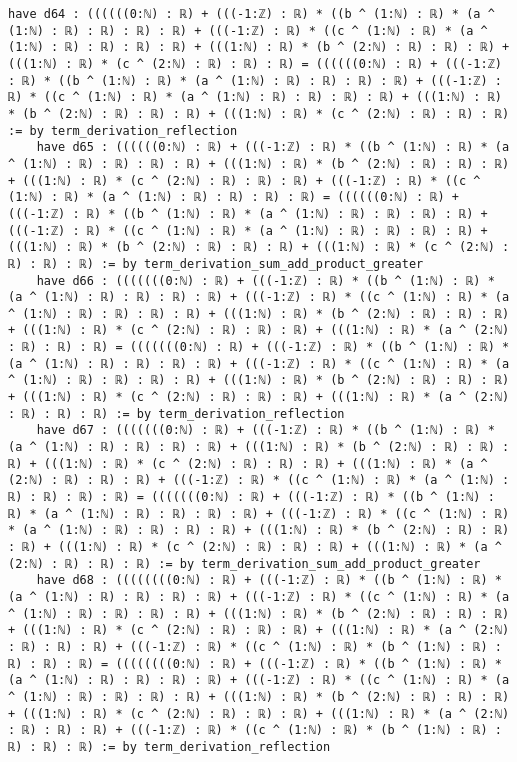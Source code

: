 \documentclass{article}
\begin{document}
\begin{tcolorbox}[colback=white!10, width=\linewidth]
\begin{lstlisting}[language=Lean4]
    have d64 : ((((((0:ℕ) : ℝ) + (((-1:ℤ) : ℝ) * ((b ^ (1:ℕ) : ℝ) * (a ^ (1:ℕ) : ℝ) : ℝ) : ℝ) : ℝ) + (((-1:ℤ) : ℝ) * ((c ^ (1:ℕ) : ℝ) * (a ^ (1:ℕ) : ℝ) : ℝ) : ℝ) : ℝ) + (((1:ℕ) : ℝ) * (b ^ (2:ℕ) : ℝ) : ℝ) : ℝ) + (((1:ℕ) : ℝ) * (c ^ (2:ℕ) : ℝ) : ℝ) : ℝ) = ((((((0:ℕ) : ℝ) + (((-1:ℤ) : ℝ) * ((b ^ (1:ℕ) : ℝ) * (a ^ (1:ℕ) : ℝ) : ℝ) : ℝ) : ℝ) + (((-1:ℤ) : ℝ) * ((c ^ (1:ℕ) : ℝ) * (a ^ (1:ℕ) : ℝ) : ℝ) : ℝ) : ℝ) + (((1:ℕ) : ℝ) * (b ^ (2:ℕ) : ℝ) : ℝ) : ℝ) + (((1:ℕ) : ℝ) * (c ^ (2:ℕ) : ℝ) : ℝ) : ℝ) := by term_derivation_reflection
    have d65 : ((((((0:ℕ) : ℝ) + (((-1:ℤ) : ℝ) * ((b ^ (1:ℕ) : ℝ) * (a ^ (1:ℕ) : ℝ) : ℝ) : ℝ) : ℝ) + (((1:ℕ) : ℝ) * (b ^ (2:ℕ) : ℝ) : ℝ) : ℝ) + (((1:ℕ) : ℝ) * (c ^ (2:ℕ) : ℝ) : ℝ) : ℝ) + (((-1:ℤ) : ℝ) * ((c ^ (1:ℕ) : ℝ) * (a ^ (1:ℕ) : ℝ) : ℝ) : ℝ) : ℝ) = ((((((0:ℕ) : ℝ) + (((-1:ℤ) : ℝ) * ((b ^ (1:ℕ) : ℝ) * (a ^ (1:ℕ) : ℝ) : ℝ) : ℝ) : ℝ) + (((-1:ℤ) : ℝ) * ((c ^ (1:ℕ) : ℝ) * (a ^ (1:ℕ) : ℝ) : ℝ) : ℝ) : ℝ) + (((1:ℕ) : ℝ) * (b ^ (2:ℕ) : ℝ) : ℝ) : ℝ) + (((1:ℕ) : ℝ) * (c ^ (2:ℕ) : ℝ) : ℝ) : ℝ) := by term_derivation_sum_add_product_greater
    have d66 : (((((((0:ℕ) : ℝ) + (((-1:ℤ) : ℝ) * ((b ^ (1:ℕ) : ℝ) * (a ^ (1:ℕ) : ℝ) : ℝ) : ℝ) : ℝ) + (((-1:ℤ) : ℝ) * ((c ^ (1:ℕ) : ℝ) * (a ^ (1:ℕ) : ℝ) : ℝ) : ℝ) : ℝ) + (((1:ℕ) : ℝ) * (b ^ (2:ℕ) : ℝ) : ℝ) : ℝ) + (((1:ℕ) : ℝ) * (c ^ (2:ℕ) : ℝ) : ℝ) : ℝ) + (((1:ℕ) : ℝ) * (a ^ (2:ℕ) : ℝ) : ℝ) : ℝ) = (((((((0:ℕ) : ℝ) + (((-1:ℤ) : ℝ) * ((b ^ (1:ℕ) : ℝ) * (a ^ (1:ℕ) : ℝ) : ℝ) : ℝ) : ℝ) + (((-1:ℤ) : ℝ) * ((c ^ (1:ℕ) : ℝ) * (a ^ (1:ℕ) : ℝ) : ℝ) : ℝ) : ℝ) + (((1:ℕ) : ℝ) * (b ^ (2:ℕ) : ℝ) : ℝ) : ℝ) + (((1:ℕ) : ℝ) * (c ^ (2:ℕ) : ℝ) : ℝ) : ℝ) + (((1:ℕ) : ℝ) * (a ^ (2:ℕ) : ℝ) : ℝ) : ℝ) := by term_derivation_reflection
    have d67 : (((((((0:ℕ) : ℝ) + (((-1:ℤ) : ℝ) * ((b ^ (1:ℕ) : ℝ) * (a ^ (1:ℕ) : ℝ) : ℝ) : ℝ) : ℝ) + (((1:ℕ) : ℝ) * (b ^ (2:ℕ) : ℝ) : ℝ) : ℝ) + (((1:ℕ) : ℝ) * (c ^ (2:ℕ) : ℝ) : ℝ) : ℝ) + (((1:ℕ) : ℝ) * (a ^ (2:ℕ) : ℝ) : ℝ) : ℝ) + (((-1:ℤ) : ℝ) * ((c ^ (1:ℕ) : ℝ) * (a ^ (1:ℕ) : ℝ) : ℝ) : ℝ) : ℝ) = (((((((0:ℕ) : ℝ) + (((-1:ℤ) : ℝ) * ((b ^ (1:ℕ) : ℝ) * (a ^ (1:ℕ) : ℝ) : ℝ) : ℝ) : ℝ) + (((-1:ℤ) : ℝ) * ((c ^ (1:ℕ) : ℝ) * (a ^ (1:ℕ) : ℝ) : ℝ) : ℝ) : ℝ) + (((1:ℕ) : ℝ) * (b ^ (2:ℕ) : ℝ) : ℝ) : ℝ) + (((1:ℕ) : ℝ) * (c ^ (2:ℕ) : ℝ) : ℝ) : ℝ) + (((1:ℕ) : ℝ) * (a ^ (2:ℕ) : ℝ) : ℝ) : ℝ) := by term_derivation_sum_add_product_greater
    have d68 : ((((((((0:ℕ) : ℝ) + (((-1:ℤ) : ℝ) * ((b ^ (1:ℕ) : ℝ) * (a ^ (1:ℕ) : ℝ) : ℝ) : ℝ) : ℝ) + (((-1:ℤ) : ℝ) * ((c ^ (1:ℕ) : ℝ) * (a ^ (1:ℕ) : ℝ) : ℝ) : ℝ) : ℝ) + (((1:ℕ) : ℝ) * (b ^ (2:ℕ) : ℝ) : ℝ) : ℝ) + (((1:ℕ) : ℝ) * (c ^ (2:ℕ) : ℝ) : ℝ) : ℝ) + (((1:ℕ) : ℝ) * (a ^ (2:ℕ) : ℝ) : ℝ) : ℝ) + (((-1:ℤ) : ℝ) * ((c ^ (1:ℕ) : ℝ) * (b ^ (1:ℕ) : ℝ) : ℝ) : ℝ) : ℝ) = ((((((((0:ℕ) : ℝ) + (((-1:ℤ) : ℝ) * ((b ^ (1:ℕ) : ℝ) * (a ^ (1:ℕ) : ℝ) : ℝ) : ℝ) : ℝ) + (((-1:ℤ) : ℝ) * ((c ^ (1:ℕ) : ℝ) * (a ^ (1:ℕ) : ℝ) : ℝ) : ℝ) : ℝ) + (((1:ℕ) : ℝ) * (b ^ (2:ℕ) : ℝ) : ℝ) : ℝ) + (((1:ℕ) : ℝ) * (c ^ (2:ℕ) : ℝ) : ℝ) : ℝ) + (((1:ℕ) : ℝ) * (a ^ (2:ℕ) : ℝ) : ℝ) : ℝ) + (((-1:ℤ) : ℝ) * ((c ^ (1:ℕ) : ℝ) * (b ^ (1:ℕ) : ℝ) : ℝ) : ℝ) : ℝ) := by term_derivation_reflection

\end{lstlisting}
\end{tcolorbox}
\end{document}

